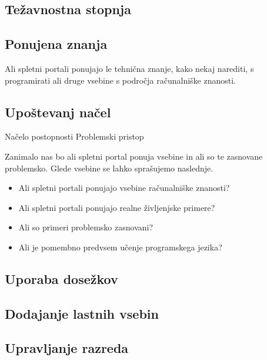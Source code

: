 \subsection{Težavnostna stopnja}
\label{sec:težavnostna_stopnja}



\subsection{Ponujena znanja}
\label{sec:vsebina_problemsk_pristop}


Ali spletni portali ponujajo le tehnična znanje, kako nekaj narediti, s
programirati ali druge vsebine s področja računalniške
znanosti.


\subsection{Upoštevanj načel}
\label{sec:upoštevanje_načel}

Načelo postopnosti
Problemski pristop

Zanimalo nas bo ali spletni portal ponuja vsebine in ali so te
zasnovane problemsko. Glede vsebine se lahko sprašujemo naslednje.

\begin{itemize}
\tightlist
\item Ali spletni portali ponujajo vsebine računalniške znanosti?
\item Ali spletni portali ponujajo realne življenjske primere?
\item Ali so primeri problemsko zasnovani?
\item Ali je pomembno predvsem učenje programskega jezika?
\end{itemize}

\subsection{Uporaba dosežkov}
\label{sec:uporaba_dosežkov}



\subsection{Dodajanje lastnih vsebin}
\label{sec:dodajanje_vsebin}


\subsection{Upravljanje razreda}
\label{sec:upravljanje_razreda}

